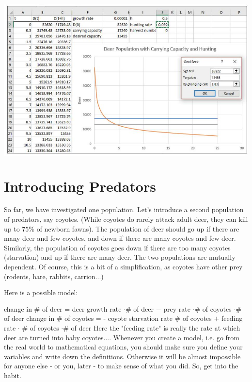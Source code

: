 \documentclass[10pt]{article}
\begin{document}
\includegraphics[max width=\textwidth]{2022_07_05_5945264bba2a5f6ba667g-14}

\section{Introducing Predators}
So far, we have investigated one population. Let's introduce a second population of predators, say coyotes. (While coyotes do rarely attack adult deer, they can kill up to $75 \%$ of newborn fawns). The population of deer should go up if there are many deer and few coyotes, and down if there are many coyotes and few deer. Similarly, the population of coyotes goes down if there are too many coyotes (starvation) and up if there are many deer. The two populations are mutually dependent. Of course, this is a bit of a simplification, as coyotes have other prey (rodents, hare, rabbits, carrion...)

Here is a possible model:

change in \# of deer = deer growth rate $\cdot \#$ of deer $-$ prey rate $\cdot \#$ of coyotes $\cdot \#$ of deer change in \# of coyotes = - coyote starvation rate $\#$ of coyotes $+$ feeding rate $\cdot$ \# of coyotes $\cdot \#$ of deer Here the "feeding rate" is really the rate at which deer are turned into baby coyotes.... Whenever you create a model, i.e. go from the real world to mathematical equations, you should make sure you define your variables and write down the definitions. Otherwise it will be almost impossible for anyone else - or you, later - to make sense of what you did. So, get into the habit.
\end{document}
